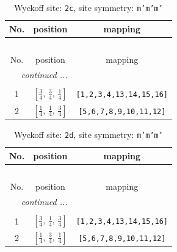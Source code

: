 \documentclass[fleqn,8pt]{jsarticle}
\begin{document}
\renewcommand{\arraystretch}{1.2}
\begin{longtable}{ccc}
\caption{Wyckoff site: {\tt 2c}, site symmetry: {\tt m'm'm'}}
 \\
 \hline \hline
No. & position & mapping \\ \hline \endfirsthead

\multicolumn{2}{l}{\tablename\ \thetable{}} \\
 \hline \hline
No. & position & mapping \\ \hline \endhead

 \hline \hline
\multicolumn{2}{r}{\footnotesize\it continued ...} \\ \endfoot

 \hline \hline
\multicolumn{2}{r}{} \\ \endlastfoot

1 & $\left[ \frac{3}{4},\, \frac{3}{4},\, \frac{1}{4} \right]$ & {\tt [1,2,3,4,13,14,15,16]} \\ \hline
2 & $\left[ \frac{1}{4},\, \frac{1}{4},\, \frac{3}{4} \right]$ & {\tt [5,6,7,8,9,10,11,12]} \\
\end{longtable}
\renewcommand{\arraystretch}{1.2}
\begin{longtable}{ccc}
\caption{Wyckoff site: {\tt 2d}, site symmetry: {\tt m'm'm'}}
 \\
 \hline \hline
No. & position & mapping \\ \hline \endfirsthead

\multicolumn{2}{l}{\tablename\ \thetable{}} \\
 \hline \hline
No. & position & mapping \\ \hline \endhead

 \hline \hline
\multicolumn{2}{r}{\footnotesize\it continued ...} \\ \endfoot

 \hline \hline
\multicolumn{2}{r}{} \\ \endlastfoot

1 & $\left[ \frac{3}{4},\, \frac{1}{4},\, \frac{3}{4} \right]$ & {\tt [1,2,3,4,13,14,15,16]} \\ \hline
2 & $\left[ \frac{1}{4},\, \frac{3}{4},\, \frac{1}{4} \right]$ & {\tt [5,6,7,8,9,10,11,12]} \\
\end{longtable}
\renewcommand{\arraystretch}{1.2}
\end{document}
